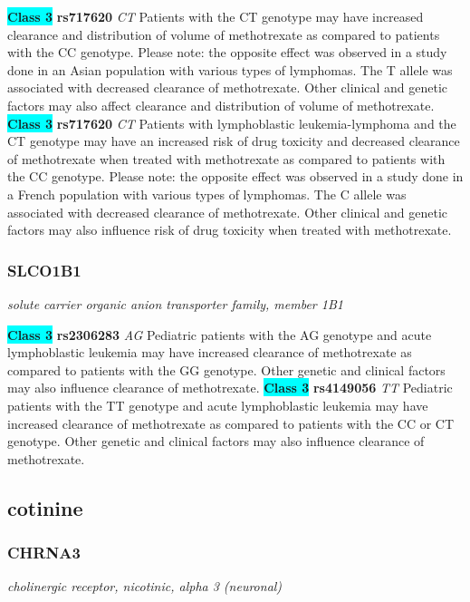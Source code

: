 \documentclass{report}
\begin{document}
\textbf{\colorbox{cyan} {Class 3}} \textbf{ rs717620 } \textit{ CT }
Patients with the CT genotype may have increased clearance and distribution of volume of methotrexate as compared to patients with the CC genotype. Please note: the opposite effect was observed in a study done in an Asian population with various types of lymphomas. The T allele was associated with decreased clearance of methotrexate. Other clinical and genetic factors may also affect clearance and distribution of volume of methotrexate. \newline\textbf{\colorbox{cyan} {Class 3}} \textbf{ rs717620 } \textit{ CT }
Patients with lymphoblastic leukemia-lymphoma and the CT genotype may have an increased risk of drug toxicity and decreased clearance of methotrexate when treated with methotrexate as compared to patients with the CC genotype. Please note: the opposite effect was observed in a study done in a French population with various types of lymphomas. The C allele was associated with decreased clearance of methotrexate. Other clinical and genetic factors may also influence risk of drug toxicity when treated with methotrexate. \newline\subsubsection{ SLCO1B1 }
\textit{ solute carrier organic anion transporter family, member 1B1 }

\textbf{\colorbox{cyan} {Class 3}} \textbf{ rs2306283 } \textit{ AG }
Pediatric patients with the AG genotype and acute lymphoblastic leukemia may have increased clearance of methotrexate as compared to patients with the GG genotype. Other genetic and clinical factors may also influence clearance of methotrexate. \newline\textbf{\colorbox{cyan} {Class 3}} \textbf{ rs4149056 } \textit{ TT }
Pediatric patients with the TT genotype and acute lymphoblastic leukemia may have increased clearance of methotrexate as compared to patients with the CC or CT genotype. Other genetic and clinical factors may also influence clearance of methotrexate.\newline\subsection{ cotinine }\subsubsection{ CHRNA3 }
\textit{ cholinergic receptor, nicotinic, alpha 3 (neuronal) }
\end{document}
